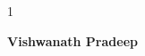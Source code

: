\begin{spacing}{1}
		
	\end{spacing}
	\begin{flushright}
		\textbf{Vishwanath Pradeep}\\
	\end{flushright}
